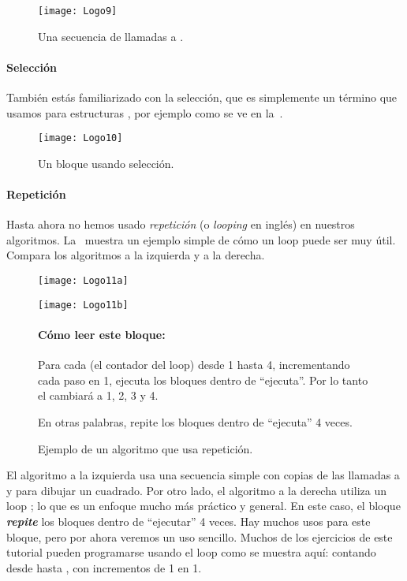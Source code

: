 \begin{figure}[H]
  \centering
  \texttt{[image: Logo9]}
  \caption{Una secuencia de llamadas a .}
  \label{fig:Logo9}
\end{figure}

\paragraph{Selección} También estás familiarizado con la selección,
que es simplemente un término que usamos para estructuras
, por ejemplo como se ve en la~.

\begin{figure}[H]
  \centering
  \texttt{[image: Logo10]}
  \caption{Un bloque usando selección.}
  \label{fig:Logo10}
\end{figure}

\paragraph{Repetición} Hasta ahora no hemos usado \emph{repetición} (o
\emph{looping} en inglés) en nuestros algoritmos. La~
muestra un ejemplo simple de cómo un loop puede ser muy útil. Compara
los algoritmos a la izquierda y a la derecha.

\begin{figure}[H]
\centering
\begin{minipage}{0.5\textwidth}  
 \centering
  \texttt{[image: Logo11a]}
\end{minipage}%
%
\begin{minipage}{0.5\textwidth}
  \texttt{[image: Logo11b]}

\paragraph{Cómo leer este bloque:}
Para cada  (el contador del loop) desde 1 hasta 4,
incrementando cada paso en 1, ejecuta los bloques dentro de
``ejecuta''. Por lo tanto el  cambiará a 1, 2, 3 y
4.

En otras palabras, repite los bloques dentro de ``ejecuta'' 4 veces.
\end{minipage}
  \caption{Ejemplo de un algoritmo que usa repetición.}
  \label{fig:Logo11}
\end{figure}

El algoritmo a la izquierda usa una secuencia simple con copias de las
llamadas a  y  para dibujar un
cuadrado. Por otro lado, el algoritmo a la derecha utiliza un loop
; lo que es un enfoque mucho más práctico y
general. En este caso, el bloque 
\textbf{\emph{repite}} los bloques dentro de ``ejecutar'' 4 veces. Hay
muchos usos para este bloque, pero por ahora veremos un uso
sencillo. Muchos de los ejercicios de este tutorial pueden programarse
usando el loop como se muestra aquí: contando desde 
hasta , con incrementos de 1 en 1.

